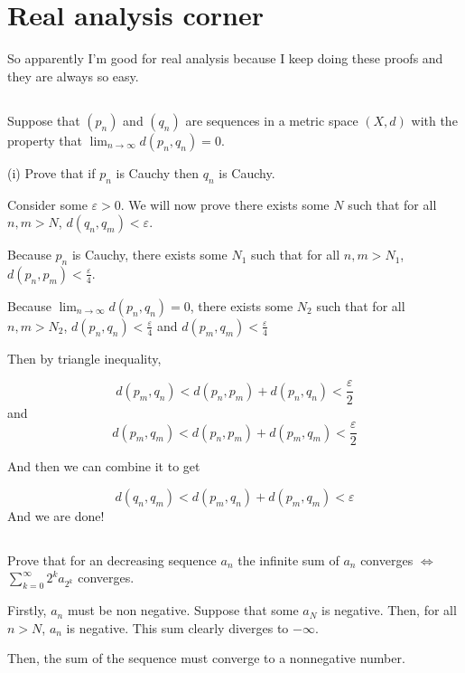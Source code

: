 \clearpage
\section{Real analysis corner}

So apparently I'm good for real analysis because I keep doing these proofs and they are always so easy.

\subsection{}

Suppose that $(p_n)$ and $(q_n)$ are sequences in a metric space $(X, d)$ with the property that $\lim _{n \to \infty} d(p_n, q_n) = 0$. 

(i) Prove that if ${p_n}$ is Cauchy then ${q_n}$ is Cauchy.


Consider some $\varepsilon > 0$. We will now prove there exists some $N$ such that for all $n, m > N$, $d(q_n, q_m) < \varepsilon$. 

Because $p_n$ is Cauchy, there exists some $N_1$ such that for all $n, m > N_1$, $d(p_n, p_m) < \frac{\varepsilon}{4}$. 

Because $\lim _{n \to \infty} d(p_n, q_n) = 0$, there exists some $N_2$ such that for all $n, m > N_2$, $d(p_n, q_n) < \frac{\varepsilon}{4}$ and $d(p_m, q_m) < \frac{\varepsilon}{4}$

Then by triangle inequality,

\[d(p_m, q_n) < d(p_n, p_m) + d(p_n, q_n) < \frac{\varepsilon}{2}\]
and
\[d(p_m, q_m) < d(p_n, p_m) + d(p_m, q_m) < \frac{\varepsilon}{2}\]

And then we can combine it to get

\[d(q_n, q_m) < d(p_m, q_n) + d(p_m, q_m) < \varepsilon\]
And we are done!

\subsection{}
\newcommand{\expSum}[1]{\sum_{k = 0}^{#1} 2^ka_{2^k}}


Prove that for an decreasing sequence $a_n$ the infinite sum of $a_n$ converges $\iff$ $\expSum{\infty}$ converges.

Firstly, $a_n$ must be non negative. Suppose that some $a_N$ is negative. Then, for all $n > N$, $a_n$ is negative. This sum clearly diverges to $-\infty$. 

Then, the sum of the sequence must converge to a nonnegative number. 

